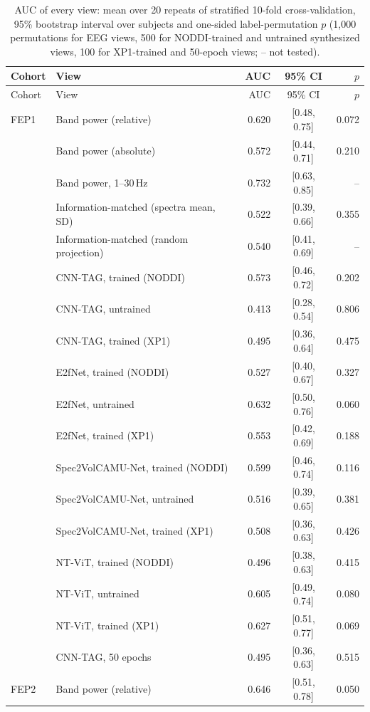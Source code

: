 \documentclass[10pt]{article}
\begin{document}
\begin{longtable}{l l r c r}
\caption{AUC of every view: mean over 20 repeats of stratified 10-fold cross-validation, 95\% bootstrap interval over subjects and one-sided label-permutation $p$ (1,000 permutations for EEG views, 500 for NODDI-trained and untrained synthesized views, 100 for XP1-trained and 50-epoch views; -- not tested).}\label{tab:s_auc}\\
\toprule
Cohort & View & AUC & 95\% CI & $p$ \\
\midrule
\endfirsthead
\toprule
Cohort & View & AUC & 95\% CI & $p$ \\
\midrule
\endhead
FEP1 & Band power (relative) & 0.620 & [0.48, 0.75] & 0.072 \\
 & Band power (absolute) & 0.572 & [0.44, 0.71] & 0.210 \\
 & Band power, 1--30\,Hz & 0.732 & [0.63, 0.85] & -- \\
 & Information-matched (spectra mean, SD) & 0.522 & [0.39, 0.66] & 0.355 \\
 & Information-matched (random projection) & 0.540 & [0.41, 0.69] & -- \\
 & CNN-TAG, trained (NODDI) & 0.573 & [0.46, 0.72] & 0.202 \\
 & CNN-TAG, untrained & 0.413 & [0.28, 0.54] & 0.806 \\
 & CNN-TAG, trained (XP1) & 0.495 & [0.36, 0.64] & 0.475 \\
 & E2fNet, trained (NODDI) & 0.527 & [0.40, 0.67] & 0.327 \\
 & E2fNet, untrained & 0.632 & [0.50, 0.76] & 0.060 \\
 & E2fNet, trained (XP1) & 0.553 & [0.42, 0.69] & 0.188 \\
 & Spec2VolCAMU-Net, trained (NODDI) & 0.599 & [0.46, 0.74] & 0.116 \\
 & Spec2VolCAMU-Net, untrained & 0.516 & [0.39, 0.65] & 0.381 \\
 & Spec2VolCAMU-Net, trained (XP1) & 0.508 & [0.36, 0.63] & 0.426 \\
 & NT-ViT, trained (NODDI) & 0.496 & [0.38, 0.63] & 0.415 \\
 & NT-ViT, untrained & 0.605 & [0.49, 0.74] & 0.080 \\
 & NT-ViT, trained (XP1) & 0.627 & [0.51, 0.77] & 0.069 \\
 & CNN-TAG, 50 epochs & 0.495 & [0.36, 0.63] & 0.515 \\
\midrule
FEP2 & Band power (relative) & 0.646 & [0.51, 0.78] & 0.050 \\

\end{longtable}
\end{document}
